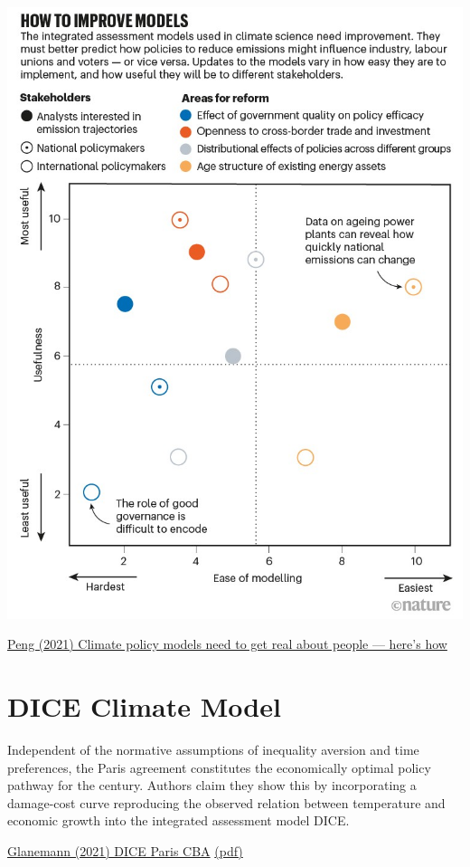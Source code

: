 \documentclass[
]{book}
\begin{document}
\includegraphics{fig/political_IAM.jpg}

\href{https://www.nature.com/articles/d41586-021-01500-2}{Peng (2021) Climate policy models need to get real about people --- here's how}

\hypertarget{dice-climate-model}{%
\section{DICE Climate Model}\label{dice-climate-model}}

Independent of the
normative assumptions of inequality aversion and time preferences,
the Paris agreement constitutes the economically optimal policy pathway
for the century.
Authors claim they show this by incorporating a
damage-cost curve reproducing
the observed relation between temperature
and economic growth into the integrated assessment model DICE.

\href{https://www.nature.com/articles/s41467-019-13961-1}{Glanemann (2021) DICE Paris CBA}
\href{pdf/Glanemann_2021_DICE_Paris_CBA.pdf}{(pdf)}
\end{document}
